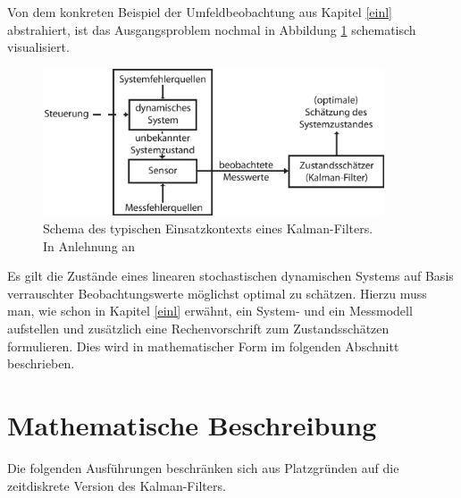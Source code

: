 \documentclass[12pt,a4paper,headsepline,bibliography=totoc,listof=totoc,headinclude=false,footinclude=false,BCOR5mm]{scrreprt} %
\begin{document}
Von dem konkreten Beispiel der Umfeldbeobachtung aus Kapitel \ref{einl} abstrahiert, ist das Ausgangsproblem nochmal in Abbildung \ref{sysabst} schematisch visualisiert.
\begin{figure}[h!]
    \centering
    \includegraphics[width=0.90\textwidth]{system}
\caption{Schema des typischen Einsatzkontexts eines Kalman-Filters. \\In Anlehnung an \cite[S. 5]{Maybeck79} }\label{sysabst}
\end{figure} Es gilt die Zust{\"a}nde eines linearen stochastischen dynamischen Systems auf Basis verrauschter Beobachtungswerte m{\"o}glichst optimal zu sch{\"a}tzen. Hierzu muss man, wie schon in Kapitel \ref{einl} erw{\"a}hnt, ein System- und ein Messmodell aufstellen und zus{\"a}tzlich eine Rechenvorschrift zum Zustandssch{\"a}tzen formulieren. Dies wird in mathematischer Form im folgenden Abschnitt beschrieben.


\section{Mathematische Beschreibung}\label{math}
Die folgenden Ausf\"uhrungen beschr\"anken sich aus Platzgr\"unden auf die zeitdiskrete Version des Kalman-Filters. 
\end{document}
